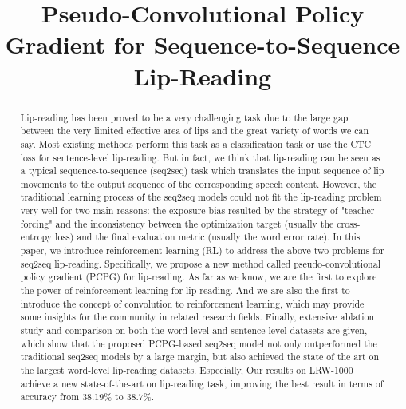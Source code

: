 \documentclass{bmvc2k}
\title{Pseudo-Convolutional Policy Gradient for Sequence-to-Sequence Lip-Reading}
\begin{document}
	
	\maketitle
	
	\begin{abstract}
		Lip-reading has been proved to be a very challenging task due to the large gap between the very limited effective area of lips and the great variety of words we can say. Most existing methods perform this task as a classification task or use the CTC loss for sentence-level lip-reading. But in fact, we think that lip-reading can be seen as a typical sequence-to-sequence (seq2seq) task which translates the input sequence of lip movements to the output sequence of the corresponding speech content. However, the traditional learning process of the seq2seq models could not fit the lip-reading problem very well for two main reasons: the exposure bias resulted by the strategy of "teacher-forcing" and the inconsistency between the optimization target (usually the cross-entropy loss) and the final evaluation metric (usually the word error rate). In this paper, we introduce reinforcement learning (RL) to address the above two problems for seq2seq lip-reading. Specifically, we propose a new method called pseudo-convolutional policy gradient (PCPG) for lip-reading. As far as we know, we are the first to explore the power of reinforcement learning for lip-reading. And we are also the first to introduce the concept of convolution to reinforcement learning, which may provide some insights for the community in related research fields. Finally, extensive ablation study and comparison on both the word-level and sentence-level datasets are given, which show that the proposed PCPG-based seq2seq model not only outperformed the traditional seq2seq models by a large margin, but also achieved the state of the art on the largest word-level lip-reading datasets. Especially, Our results on LRW-1000 achieve a new state-of-the-art on lip-reading task, improving the best result in terms of accuracy from 38.19$\%$ to 38.7$\%$.
		
	\end{abstract}
	
\end{document}
